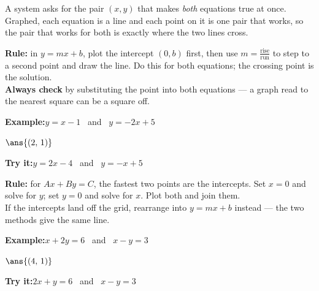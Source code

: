 \documentclass[12pt]{article}
\begin{document}

\noindent\small A system asks for the pair $(x, y)$ that makes \emph{both}
equations true at once. Graphed, each equation is a line and each point on it is
one pair that works, so the pair that works for both is exactly where the two
lines cross.\normalsize

\begin{formulabox}
\textbf{Rule:} in $y = mx + b$, plot the intercept $(0, b)$ first, then use
$m = \frac{\text{rise}}{\text{run}}$ to step to a second point and draw the
line. Do this for both equations; the crossing point is the solution.\\[3pt]
\textbf{Always check} by substituting the point into both equations --- a
graph read to the nearest square can be a square off.
\end{formulabox}
\begin{examplebox}
\textbf{Example:}\quad $y = x - 1$ \ and \ $y = -2x + 5$

$\ans{(2,\, 1)}$
\end{examplebox}
\begin{tryitbox}
\textbf{Try it:}\quad $y = 2x - 4$ \ and \ $y = -x + 5$\\[2pt]
\end{tryitbox}

\begin{formulabox}
\textbf{Rule:} for $Ax + By = C$, the fastest two points are the intercepts.
Set $x = 0$ and solve for $y$; set $y = 0$ and solve for $x$. Plot both and
join them.\\[3pt]
If the intercepts land off the grid, rearrange into $y = mx + b$ instead ---
the two methods give the same line.
\end{formulabox}
\begin{examplebox}
\textbf{Example:}\quad $x + 2y = 6$ \ and \ $x - y = 3$

$\ans{(4,\, 1)}$
\end{examplebox}
\begin{tryitbox}
\textbf{Try it:}\quad $2x + y = 6$ \ and \ $x - y = 3$\\[2pt]
\end{tryitbox}
\end{document}
